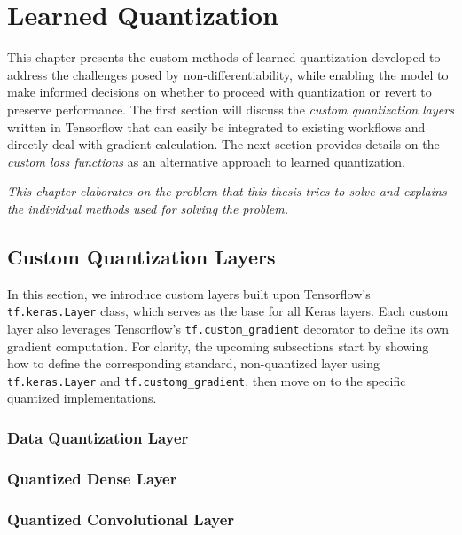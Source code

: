 \chapter{Learned Quantization\label{cha:chapter3}}
This chapter presents the custom methods of learned quantization developed to address the challenges posed by non-differentiability, 
while enabling the model to make informed decisions on whether to proceed with quantization or revert to preserve performance.
The first section will discuss the \textit{custom quantization layers} written in Tensorflow that can easily be
integrated to existing workflows and directly deal with gradient calculation. The next section provides details on the \textit{custom loss functions} as 
an alternative approach to learned quantization.

\textit{This chapter elaborates on the problem that this thesis tries to solve and explains the individual methods used for solving the problem. }

\section{Custom Quantization Layers}
\label{sec:customlayer}
In this section, we introduce custom layers built upon Tensorflow's \texttt{tf.keras.Layer} class, 
which serves as the base for all Keras layers. Each custom layer also leverages Tensorflow's 
\texttt{tf.custom\_gradient} decorator to define its own gradient computation.
For clarity, the upcoming subsections start by showing how to define the corresponding standard, 
non-quantized layer using \texttt{tf.keras.Layer} and \texttt{tf.customg\_gradient},
then move on to the specific quantized implementations.

\subsection{Data Quantization Layer}
\label{subsec:dataquantization}


\subsection{Quantized Dense Layer}
\label{subsec:quantizeddense}

\subsection{Quantized Convolutional Layer}
\label{subsec:quantizedconvolutional}

